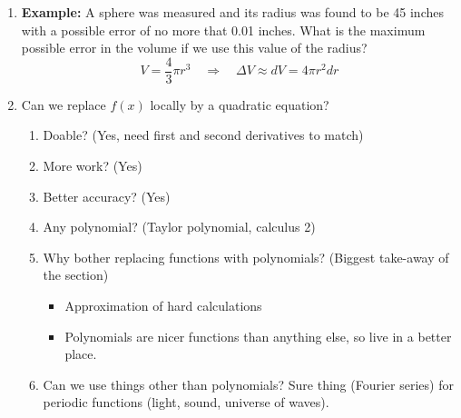 \documentclass{article}
\begin{document}
\begin{enumerate}
\item {\bf Example:}  A sphere was measured and its radius was found to be 45 inches with a possible error of no more that 0.01 inches.  
What is the maximum possible error in the volume if we use this value of the radius?
\[
V = \frac{4}{3}\pi r^3 \quad \Rightarrow \quad \Delta V \approx dV = 4\pi r^2 dr
\]

\item Can we replace $f(x)$ locally by a quadratic equation?
\begin{enumerate}
\item Doable? (Yes, need first and second derivatives to match)
\item More work? (Yes)
\item Better accuracy? (Yes)
\item Any polynomial? (Taylor polynomial, calculus 2)
\item Why bother replacing functions with polynomials? (Biggest take-away of the section)
\begin{itemize}
\item Approximation of hard calculations
\item Polynomials are nicer functions than anything else, so live in a better place.
\end{itemize}
\item Can we use things other than polynomials? Sure thing (Fourier series) for periodic functions (light, sound, universe of waves).
\end{enumerate}
\end{enumerate}


\end{document}
